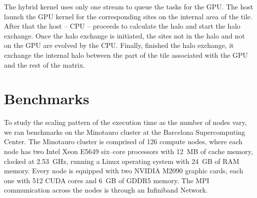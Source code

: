 

The hybrid kernel uses only one stream to queue the tasks for the GPU. The host launch the GPU kernel for the corresponding sites on the internal area of the tile. After that the host -- CPU -- proceeds to calculate the halo and start the halo exchange. Once the halo exchange is initiated, the sites not in the halo and not on the GPU are evolved by the CPU. Finally, finished the halo exchange, it exchange the internal halo between the part of the tile associated with the GPU and the rest of the matrix.

\section{Benchmarks}
To study the scaling pattern of the execution time as the number of nodes vary, we ran benchmarks on the Minotauro cluster at the Barcelona Supercomputing Center. The Minotauro cluster is comprised of 126 compute nodes, where each node has two Intel Xeon E5649 six--core processors with 12~MB of cache memory, clocked at 2.53~GHz, running a Linux operating system with 24~GB of RAM memory. Every node is equipped with two NVIDIA M2090 graphic cards, each one with 512 CUDA cores and 6~GB of GDDR5 memory. The MPI communication across the nodes is through an Infiniband Network. 


